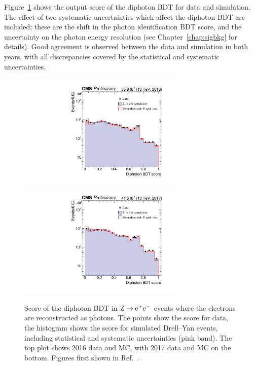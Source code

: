 Figure~\ref{fig:cat_diphoBDT} shows the output score of the diphoton BDT for data and simulation.
The effect of two systematic uncertainties which affect the diphoton BDT are included;
these are the shift in the photon identification BDT score, 
and the uncertainty on the photon energy resolution (see Chapter~\ref{chap:sigbkg} for details).
Good agreement is observed between the data and simulation in both years, 
with all discrepancies covered by the statistical and systematic uncertainties.

\begin{figure}[hptb]
  \centering
  \includegraphics[width=0.7\textwidth]{Figures/Categorisation/DiphoBDT_2016.pdf}
  \includegraphics[width=0.7\textwidth]{Figures/Categorisation/DiphoBDT_2017.pdf}
  \caption[Validation of the diphoton BDT in \Zee events.]
  {
    Score of the diphoton BDT in $\mathrm{Z}\rightarrow{\mathrm{e}^{+}\mathrm{e}^{-}}$
    events where the electrons are reconstructed as photons.
    The points show the score for data, the histogram shows
    the score for simulated Drell--Yan events, including statistical and 
    systematic uncertainties (pink band).
    The top plot shows 2016 data and MC,
    with 2017 data and MC on the bottom.
    Figures first shown in Ref.~\cite{HIG-18-029}.
  }
\label{fig:cat_diphoBDT}
\end{figure}

